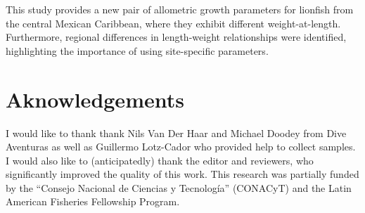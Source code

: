 \documentclass[fleqn,10pt,lineno]{wlpeerj} %
\theoremstyle{definition}
\theoremstyle{definition}
\theoremstyle{definition}
\theoremstyle{remark}
\begin{document}
This study provides a new pair of allometric growth parameters for
lionfish from the central Mexican Caribbean, where they exhibit
different weight-at-length. Furthermore, regional differences in
length-weight relationships were identified, highlighting the importance
of using site-specific parameters.

\section{Aknowledgements}\label{aknowledgements}

I would like to thank thank Nils Van Der Haar and Michael Doodey from
Dive Aventuras as well as Guillermo Lotz-Cador who provided help to
collect samples. I would also like to (anticipatedly) thank the editor
and reviewers, who significantly improved the quality of this work. This
research was partially funded by the ``Consejo Nacional de Ciencias y
Tecnología'' (CONACyT) and the Latin American Fisheries Fellowship
Program.


\end{document}
